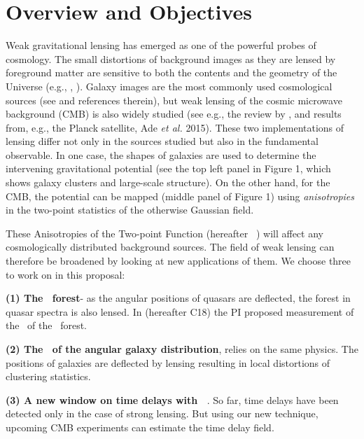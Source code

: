\section{Overview and Objectives}
Weak gravitational lensing has emerged as one of the powerful probes
of cosmology. The small distortions of background images as
they are lensed by foreground matter are sensitive to both the
contents and the geometry of the Universe (e.g., \cite{blandford92},
\cite{hoekstra2008}).  Galaxy images are the most commonly used
cosmological sources (see \cite{Kilbinger2015} and references
therein), but weak lensing of the cosmic microwave background (CMB) is
also widely studied (see e.g., the review by \cite{lewis2006}, and
results from, e.g., the Planck satellite, Ade {\it et al.} 2015).
 These two implementations of lensing differ not only 
in the sources 
studied  but also in
the fundamental observable. In one case,
 the shapes of galaxies are used to
determine the intervening gravitational potential (see the top
left panel in Figure 1, which shows galaxy clusters and large-scale structure).
On the other hand, for the
CMB, the potential can be mapped (middle panel of Figure 1) using
{\it anisotropies} in the
two-point statistics of the otherwise Gaussian field. 


These Anisotropies of the Two-point Function (hereafter \atf\ ) will 
affect any cosmologically distributed background
sources. The field of weak lensing can therefore be broadened by looking 
at new applications of them. We choose three to work  on in this proposal:

{\bf(1) The \lya\ forest}- as the angular 
positions of quasars are deflected, the forest 
in quasar spectra is also lensed.
In \cite{croft17} (hereafter C18)
 the PI proposed measurement of the 
\atf\ of the \lya\ forest.


 {\bf (2) The \atf\ 
of the angular galaxy distribution},
relies on the same physics. The positions
of galaxies are deflected by lensing
resulting in local distortions of
clustering statistics.

{\bf (3) A new window on time delays with \atf\ }. So far, time delays have been
detected only in the case of strong lensing. But using our new
technique,  upcoming CMB experiments can estimate the time
delay field.



\vspace{-0.1cm}


